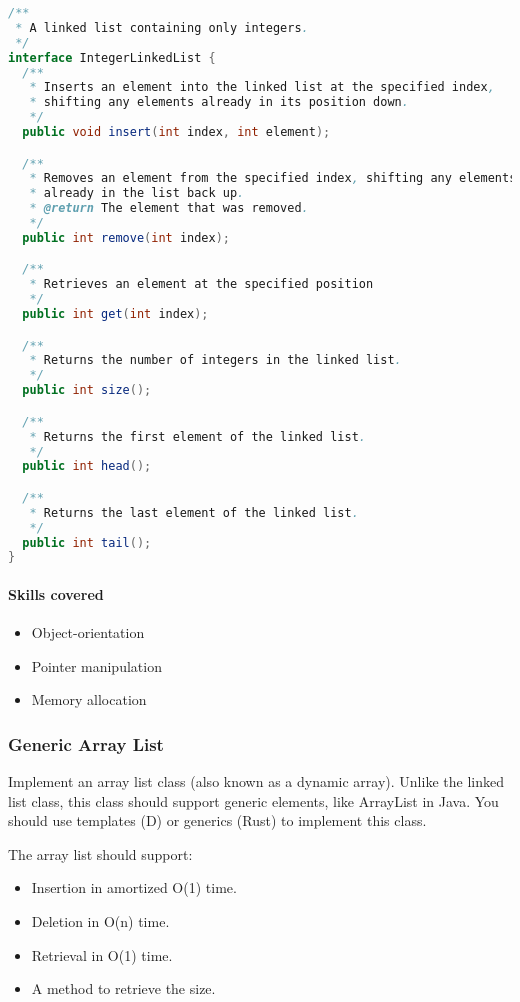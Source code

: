 \begin{lstlisting}[language=Java]
/**
 * A linked list containing only integers.
 */
interface IntegerLinkedList {
  /**
   * Inserts an element into the linked list at the specified index,
   * shifting any elements already in its position down.
   */
  public void insert(int index, int element);

  /**
   * Removes an element from the specified index, shifting any elements
   * already in the list back up.
   * @return The element that was removed.
   */
  public int remove(int index);

  /**
   * Retrieves an element at the specified position
   */
  public int get(int index);

  /**
   * Returns the number of integers in the linked list.
   */
  public int size();

  /**
   * Returns the first element of the linked list.
   */
  public int head();

  /**
   * Returns the last element of the linked list.
   */
  public int tail();
}
\end{lstlisting}

\paragraph{Skills covered}\label{skills-covered-1}

\begin{itemize}
\itemsep1pt\parskip0pt
\item
  Object-orientation
\item
  Pointer manipulation
\item
  Memory allocation
\end{itemize}

\subsubsection{Generic Array List}\label{generic-array-list}

Implement an array list class (also known as a dynamic array). Unlike
the linked list class, this class should support generic elements, like
ArrayList in Java. You should use templates (D) or generics (Rust) to
implement this class.

The array list should support:

\begin{itemize}
\itemsep1pt\parskip0pt
\item
  Insertion in amortized O(1) time.
\item
  Deletion in O(n) time.
\item
  Retrieval in O(1) time.
\item
  A method to retrieve the size.
\end{itemize}

